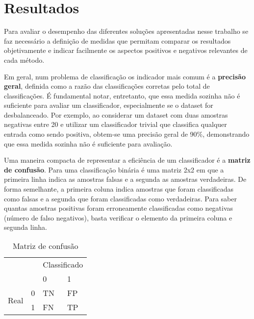 \chapter{Resultados}

Para avaliar o desempenho das diferentes soluções apresentadas nesse trabalho se faz necessário a definição de medidas que permitam comparar os resultados objetivamente e indicar facilmente os aspectos positivos e negativos relevantes de cada método.

Em geral, num problema de classificação os indicador mais comum é a \textbf{precisão geral}, definida como a razão das classificações corretas pelo total de classificações. É fundamental notar, entretanto, que essa medida sozinha não é suficiente para avaliar um classificador, especialmente se o dataset for desbalanceado. Por exemplo, ao considerar um dataset com duas amostras negativas entre 20 e utilizar um classificador trivial que classifica qualquer entrada como sendo positiva, obtem-se uma precisão geral de 90\%, demonstrando que essa medida sozinha não é suficiente para avaliação.

Uma maneira compacta de representar a eficiência de um classificador é a \textbf{matriz de confusão}. Para uma classificação binária é uma matriz 2x2 em que a primeira linha indica as amostras falsas e a segunda as amostras verdadeiras. De forma semelhante, a primeira coluna indica amostras que foram classificadas como falsas e a segunda que foram classificadas como verdadeiras. Para saber quantas amostras positivas foram erroneamente classificadas como negativas (número de falso negativos), basta verificar o elemento da primeira coluna e segunda linha.

\begin{table}[h]
\centering
\caption{Matriz de confusão}
\label{tab:matriz-confusão}
\begin{tabular}{ll|l|l|}
\cline{3-4}
                                            &   & \multicolumn{2}{l|}{Classificado} \\ \cline{3-4} 
                                            &   & 0               & 1               \\ \hline
\multicolumn{1}{|l|}{\multirow{2}{*}{Real}} & 0 & TN              & FP              \\ \cline{2-4} 
\multicolumn{1}{|l|}{}                      & 1 & FN              & TP              \\ \hline
\end{tabular}
\end{table}


